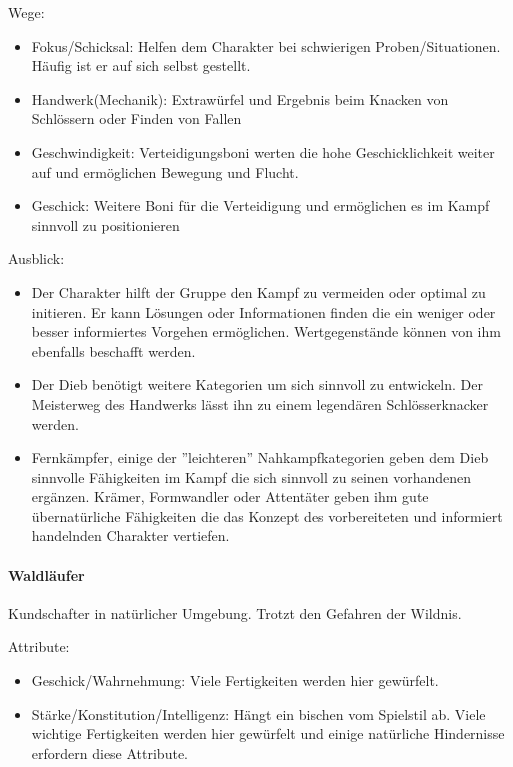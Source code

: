 \documentclass{article}
\begin{document}
Wege:
\begin{itemize}
\item Fokus/Schicksal: Helfen dem Charakter bei schwierigen Proben/Situationen. Häufig ist er auf sich selbst gestellt.
\item Handwerk(Mechanik): Extrawürfel und Ergebnis beim Knacken von Schlössern oder Finden von Fallen
\item Geschwindigkeit: Verteidigungsboni werten die hohe Geschicklichkeit weiter auf und ermöglichen Bewegung und Flucht.
\item Geschick: Weitere Boni für die Verteidigung und ermöglichen es im Kampf sinnvoll zu positionieren
\end{itemize}

Ausblick:
\begin{itemize}
\item Der Charakter hilft der Gruppe den Kampf zu vermeiden oder optimal zu initieren. Er kann Lösungen oder Informationen finden die ein weniger oder besser informiertes Vorgehen ermöglichen. Wertgegenstände können von ihm ebenfalls beschafft werden.
\item Der Dieb benötigt weitere Kategorien um sich sinnvoll zu entwickeln. Der Meisterweg des Handwerks lässt ihn zu einem legendären Schlösserknacker werden.
\item Fernkämpfer, einige der ''leichteren'' Nahkampfkategorien geben dem Dieb sinnvolle Fähigkeiten im Kampf die sich sinnvoll zu seinen vorhandenen ergänzen. Krämer, Formwandler oder Attentäter geben ihm gute übernatürliche Fähigkeiten die das Konzept des vorbereiteten und informiert handelnden Charakter vertiefen.
\end{itemize}

\paragraph{Waldläufer}
Kundschafter in natürlicher Umgebung. Trotzt den Gefahren der Wildnis.

Attribute:
\begin{itemize}
\item Geschick/Wahrnehmung: Viele Fertigkeiten werden hier gewürfelt.
\item Stärke/Konstitution/Intelligenz: Hängt ein bischen vom Spielstil ab. Viele wichtige Fertigkeiten werden hier gewürfelt und einige natürliche Hindernisse erfordern diese Attribute.
\end{itemize}
\end{document}
